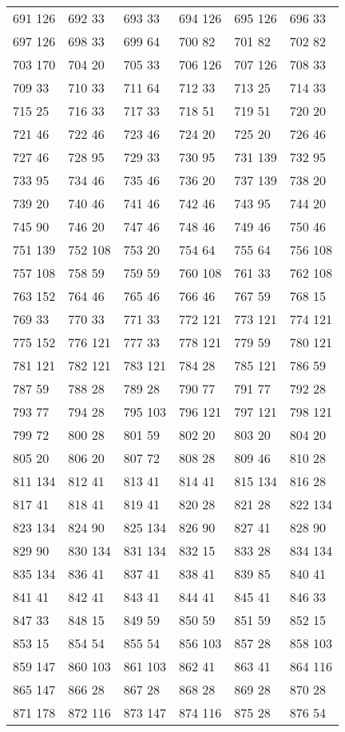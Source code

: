 \begin{longtable}{llllll}
691  126&692 33&693 33&694 126&695 126&696 33\\
697  126&698 33&699 64&700 82&701 82&702 82\\
703  170&704 20&705 33&706 126&707 126&708 33\\
709  33&710 33&711 64&712 33&713 25&714 33\\
715  25&716 33&717 33&718 51&719 51&720 20\\
721  46&722 46&723 46&724 20&725 20&726 46\\
727  46&728 95&729 33&730 95&731 139&732 95\\
733  95&734 46&735 46&736 20&737 139&738 20\\
739  20&740 46&741 46&742 46&743 95&744 20\\
745  90&746 20&747 46&748 46&749 46&750 46\\
751  139&752 108&753 20&754 64&755 64&756 108\\
757  108&758 59&759 59&760 108&761 33&762 108\\
763  152&764 46&765 46&766 46&767 59&768 15\\
769  33&770 33&771 33&772 121&773 121&774 121\\
775  152&776 121&777 33&778 121&779 59&780 121\\
781  121&782 121&783 121&784 28&785 121&786 59\\
787  59&788 28&789 28&790 77&791 77&792 28\\
793  77&794 28&795 103&796 121&797 121&798 121\\
799  72&800 28&801 59&802 20&803 20&804 20\\
805  20&806 20&807 72&808 28&809 46&810 28\\
811  134&812 41&813 41&814 41&815 134&816 28\\
817  41&818 41&819 41&820 28&821 28&822 134\\
823  134&824 90&825 134&826 90&827 41&828 90\\
829  90&830 134&831 134&832 15&833 28&834 134\\
835  134&836 41&837 41&838 41&839 85&840 41\\
841  41&842 41&843 41&844 41&845 41&846 33\\
847  33&848 15&849 59&850 59&851 59&852 15\\
853  15&854 54&855 54&856 103&857 28&858 103\\
859  147&860 103&861 103&862 41&863 41&864 116\\
865  147&866 28&867 28&868 28&869 28&870 28\\
871  178&872 116&873 147&874 116&875 28&876 54\\

\end{longtable}
